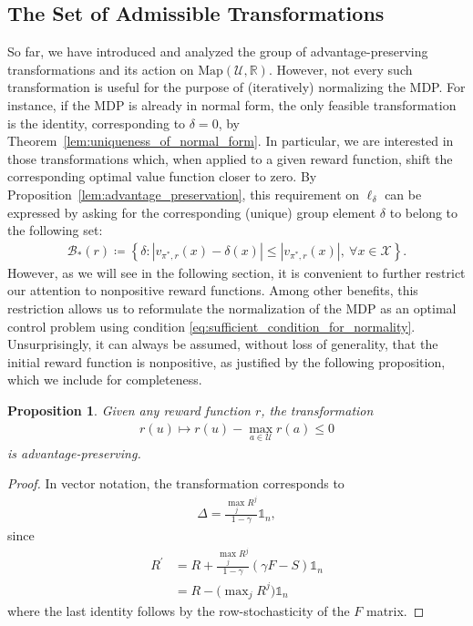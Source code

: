 \documentclass[10pt,leqno]{amsart}
\newcommand{\R}{\mathbb{R}}
\newcommand{\U}{\mathcal{U}}
\newcommand{\X}{\mathcal{X}}
\newcommand{\cost}{r}
\newcommand{\vvarg}[1]{v_{#1}}
\newcommand{\Cost}{R}
\newcommand{\F}{F}
\newcommand{\policy}{\pi}
\newcommand{\state}{x} %
\newcommand{\act}{u}   %
\newcommand{\disc}{\gamma}
\newcommand{\Proj}{S}
\newcommand{\maps}{\text{Map}}
\newcommand{\actAdvsym}{\ell}
\newcommand{\actAdv}[1]{\actAdvsym_{#1}}
\newtheorem{proposition}[theorem]{Proposition}
\begin{document}
\subsection{The Set of Admissible Transformations}
\label{subsec:section_1B}
So far, we have introduced and analyzed the group of advantage-preserving transformations and its action on $\maps(\U, \R)$. However, not every such transformation is useful for the purpose of (iteratively) normalizing the MDP. For instance, if the MDP is already in normal form, the only feasible transformation is the identity, corresponding to $\delta = 0$, by Theorem~\ref{lem:uniqueness_of_normal_form}. In particular, we are interested in those transformations which, when applied to a given reward function, shift the corresponding optimal value function closer to zero. By Proposition~\ref{lem:advantage_preservation}, this requirement on $\actAdv{\delta}$ can be expressed by asking for the corresponding (unique) group element $\delta$ to belong to the following set:
\begin{align}\label{eq:feasible_ball}
    \mathcal{B}_*(\cost) \coloneqq \left\{\delta : |\vvarg{\policy^*\!, \cost}(\state) - \delta(\state)| \leq |\vvarg{\policy^*\!, \cost}(\state)|, ~\forall \state \in \X\right\}.
\end{align}
\noindent
However, as we will see in the following section, it is convenient to further restrict our attention to nonpositive reward functions. Among other benefits, this restriction allows us to reformulate the normalization of the MDP as an optimal control problem using condition \eqref{eq:sufficient_condition_for_normality}. Unsurprisingly, it can always be assumed, without loss of generality, that the initial reward function is nonpositive, as justified by the following proposition, which we include for completeness.
\begin{proposition}\label{lem:wlog_reward_nonpositivity}
    Given any reward function $\cost$, the transformation
    \begin{align*}
        \cost(\act) \mapsto \cost(\act) - \max_{a \in \U} \cost(a) \leq 0
    \end{align*}
    is advantage-preserving.
\end{proposition}
\begin{proof}
    In vector notation, the transformation corresponds to 
    \begin{align*}
        \Delta = \frac{\max_j \Cost^j}{1 - \disc} \mathds{1}_n,
    \end{align*}
    since
    \begin{align*}
        \Cost^\prime &= \Cost + \frac{\max_j \Cost^j}{1 - \disc} (\disc \F - \Proj) \mathds{1}_n\\
        &= \Cost - \bigl(\max\nolimits_j \Cost^j\bigr) \mathds{1}_n
    \end{align*}
    where the last identity follows by the row-stochasticity of the $\F$ matrix.
\end{proof}
\end{document}
